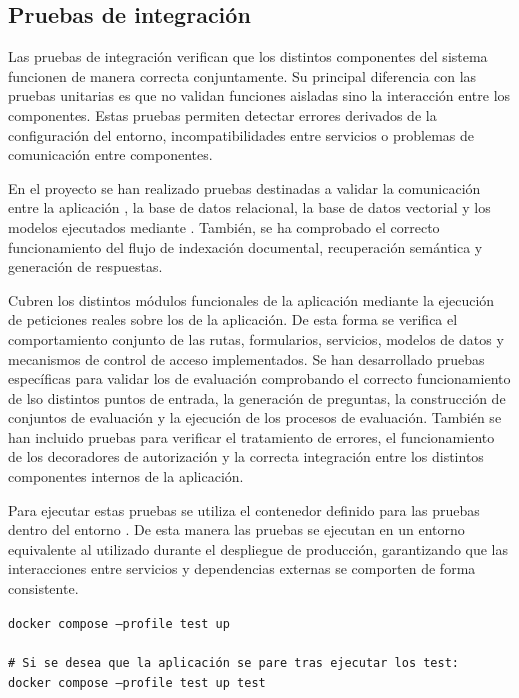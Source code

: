 \subsection{Pruebas de integración}

Las pruebas de integración verifican que los distintos componentes del sistema funcionen de manera correcta conjuntamente. Su principal diferencia con las pruebas unitarias es que no validan funciones aisladas sino la interacción entre los componentes. Estas pruebas permiten detectar errores derivados de la configuración del entorno, incompatibilidades entre servicios o problemas de comunicación entre componentes.

En el proyecto se han realizado pruebas destinadas a validar la comunicación entre la aplicación , la base de datos relacional, la base de datos vectorial  y los modelos ejecutados mediante . También, se ha comprobado el correcto funcionamiento del flujo de indexación documental, recuperación semántica y generación de respuestas.

Cubren los distintos módulos funcionales de la aplicación mediante la ejecución de peticiones reales sobre los  de la aplicación. De esta forma se verifica el comportamiento conjunto de las rutas, formularios, servicios, modelos de datos y mecanismos de control de acceso implementados. Se han desarrollado pruebas específicas para validar los  de evaluación  comprobando el correcto funcionamiento de lso distintos puntos de entrada, la generación de preguntas, la construcción de conjuntos de evaluación y la ejecución de los procesos de evaluación. También se han incluido pruebas para verificar el tratamiento de errores, el funcionamiento de los decoradores de autorización y la correcta integración entre los distintos componentes internos de la aplicación.

Para ejecutar estas pruebas se utiliza el contenedor definido para las pruebas dentro del entorno . De esta manera las pruebas se ejecutan en un entorno equivalente al utilizado durante el despliegue de producción, garantizando que las interacciones entre servicios y dependencias externas se comporten de forma consistente.

\begin{tcolorbox}[
	colback=black!3,
	colframe=black!30,
	boxrule=0.5pt,
	arc=2mm,
	title= Terminal - Ejecución de pruebas mediante Docker,
	fonttitle=\bfseries,
	breakable 
]
	{\footnotesize
		\noindent
		\texttt{docker compose --profile test up}\\
		\\
		\texttt{\# Si se desea que la aplicación se pare tras ejecutar los test:}\\
		\texttt{docker compose --profile test up test}
	}
\end{tcolorbox}

